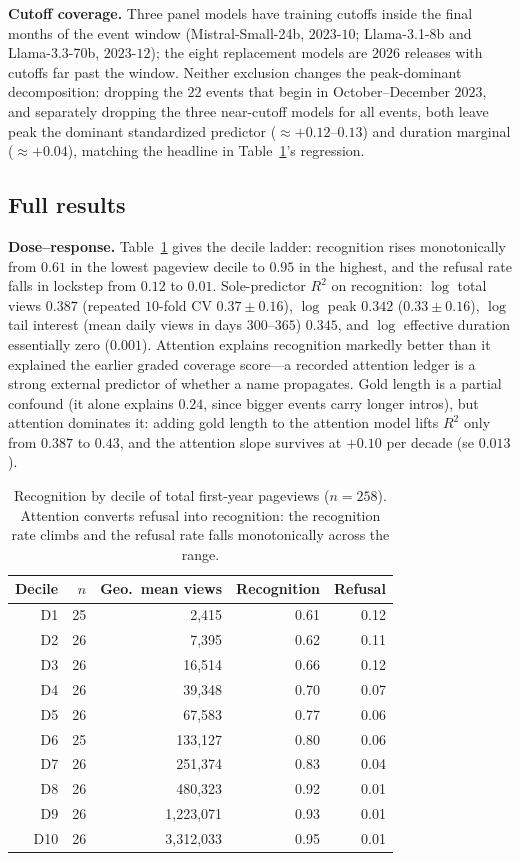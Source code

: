 \textbf{Cutoff coverage.} Three panel models have training cutoffs inside the final months of the event window (Mistral-Small-24b, $2023$-$10$; Llama-3.1-8b and Llama-3.3-70b, $2023$-$12$); the eight replacement models are $2026$ releases with cutoffs far past the window. Neither exclusion changes the peak-dominant decomposition: dropping the $22$ events that begin in October--December $2023$, and separately dropping the three near-cutoff models for all events, both leave peak the dominant standardized predictor (${\approx}+0.12$--$0.13$) and duration marginal (${\approx}+0.04$), matching the headline in Table~\ref{tab:events-deciles}'s regression.

\subsection{Full results}

\textbf{Dose--response.} Table~\ref{tab:events-deciles} gives the decile ladder: recognition rises monotonically from $0.61$ in the lowest pageview decile to $0.95$ in the highest, and the refusal rate falls in lockstep from $0.12$ to $0.01$. Sole-predictor $R^2$ on recognition: $\log$ total views $0.387$ (repeated $10$-fold CV $0.37 \pm 0.16$), $\log$ peak $0.342$ ($0.33 \pm 0.16$), $\log$ tail interest (mean daily views in days $300$--$365$) $0.345$, and $\log$ effective duration essentially zero ($0.001$). Attention explains recognition markedly better than it explained the earlier graded coverage score---a recorded attention ledger is a strong external predictor of whether a name propagates. Gold length is a partial confound (it alone explains $0.24$, since bigger events carry longer intros), but attention dominates it: adding gold length to the attention model lifts $R^2$ only from $0.387$ to $0.43$, and the attention slope survives at $+0.10$ per decade (se $0.013$).

\begin{table}[!htbp]
\centering
\small
\caption{Recognition by decile of total first-year pageviews ($n = 258$). Attention converts refusal into recognition: the recognition rate climbs and the refusal rate falls monotonically across the range.}
\label{tab:events-deciles}
\begin{tabular}{rrrrr}
\toprule
Decile & $n$ & Geo.\ mean views & Recognition & Refusal \\
\midrule
D1 & 25 & 2{,}415 & 0.61 & 0.12 \\
D2 & 26 & 7{,}395 & 0.62 & 0.11 \\
D3 & 26 & 16{,}514 & 0.66 & 0.12 \\
D4 & 26 & 39{,}348 & 0.70 & 0.07 \\
D5 & 26 & 67{,}583 & 0.77 & 0.06 \\
D6 & 25 & 133{,}127 & 0.80 & 0.06 \\
D7 & 26 & 251{,}374 & 0.83 & 0.04 \\
D8 & 26 & 480{,}323 & 0.92 & 0.01 \\
D9 & 26 & 1{,}223{,}071 & 0.93 & 0.01 \\
D10 & 26 & 3{,}312{,}033 & 0.95 & 0.01 \\
\bottomrule
\end{tabular}
\end{table}

